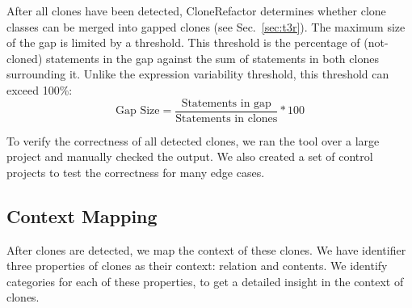 \documentclass[sigconf,review]{acmart}
\begin{document}
After all clones have been detected, CloneRefactor determines whether clone classes can be merged into gapped clones (see Sec.~\ref{sec:t3r}). The maximum size of the gap is limited by a threshold. This threshold is the percentage of (not-cloned) statements in the gap against the sum of statements in both clones surrounding it. Unlike the expression variability threshold, this threshold can exceed 100\%:
\begin{equation}\label{eq:type3r}
\text{Gap Size}=\frac{\text{Statements in gap}}{\text{Statements in clones}}*100
\end{equation}

To verify the correctness of all detected clones, we ran the tool over a large project and manually checked the output. We also created a set of control projects to test the correctness for many edge cases.

\subsection{Context Mapping} \label{sec:context}
After clones are detected, we map the context of these clones. We have identifier three properties of clones as their context: relation and contents. We identify categories for each of these properties, to get a detailed insight in the context of clones.
\end{document}
